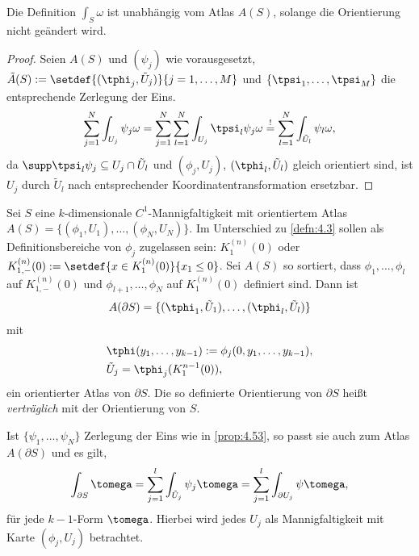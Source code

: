 \begin{prop}
\label{prop:4.53}
Die Definition $\int_S \omega$ ist unabhängig vom Atlas $A(S)$, solange die
Orientierung nicht geändert wird.\fishhere
\end{prop}
\begin{proof}
Seien $A(S)$ und $(\psi_j)$ wie vorausgesetzt,
$\tilde{A}(S):=\setdef{(\tphi_j,\tilde{U}_j)}{j=1,\ldots,M}$ und
$\{\tpsi_1,\ldots,\tpsi_M\}$ die entsprechende Zerlegung der Eins.
\begin{align*}
\sum\limits_{j=1}^N \int_{U_j} \psi_j \omega
= \sum\limits_{j=1}^N\sum\limits_{l=1}^N \int_{U_j} \tpsi_l\psi_j \omega
\overset{!}{=} \sum\limits_{l=1}^N \int_{\tilde{U}_l} \psi_l \omega,
\end{align*}
da $\supp \tpsi_l\psi_j\subseteq
U_j\cap \tilde{U}_l$ und $(\phi_j,U_j)$, $(\tphi_l,\tilde{U}_l)$ gleich
orientiert sind, ist $U_j$ durch $\tilde{U}_l$ nach entsprechender
Koordinatentransformation ersetzbar.\qedhere
\end{proof}

\begin{defn}
\label{defn:4.54}
Sei $S$ eine $k$-dimensionale $C^1$-Mannigfaltigkeit mit orientiertem Atlas
$A(S) = \{(\phi_1,U_1),\ldots,(\phi_N,U_N)\}$. Im Unterschied zu \ref{defn:4.3}
sollen als Definitionsbereiche von $\phi_j$ zugelassen sein: $K_1^{(n)}(0)$
oder $K_{1,-}^{(n)}(0) := \setdef{x\in K_1^{(n)}(0)}{x_1\le 0}$. Sei $A(S)$ so
sortiert, dass $\phi_1,\ldots,\phi_l$ auf $K_{1,-}^{(n)}(0)$ und
$\phi_{l+1},\ldots,\phi_N$ auf $K_1^{(n)}(0)$ definiert sind. Dann ist
\begin{align*}
A(\partial S) = \{(\tphi_1,\tilde{U}_1),\ldots,(\tphi_l,\tilde{U}_l)\}
\end{align*}
mit
\begin{align*}
&\tphi(y_1,\ldots,y_{k-1}) := \phi_j(0,y_1,\ldots,y_{k-1}),\\
&\tilde{U}_j = \tphi_j(K_1^{n-1}(0)),
\end{align*}
ein orientierter Atlas von $\partial S$. Die so definierte Orientierung von
$\partial S$ heißt \emph{verträglich} mit der Orientierung von $S$.

Ist $\{\psi_1,\ldots,\psi_N\}$ Zerlegung der Eins wie in \ref{prop:4.53}, so
passt sie auch zum Atlas $A(\partial S)$ und es gilt,
\begin{align*}
\int_{\partial S} \tomega = \sum\limits_{j=1}^l \int_{\tilde{U}_j} \psi_j
\tomega = \sum\limits_{j=1}^l \int_{\partial U_j} \psi\tomega,
\end{align*}
für jede $k-1$-Form $\tomega$. Hierbei wird jedes $U_j$ als Mannigfaltigkeit
mit Karte $(\phi_j,U_j)$ betrachtet.\fishhere
\end{defn}


